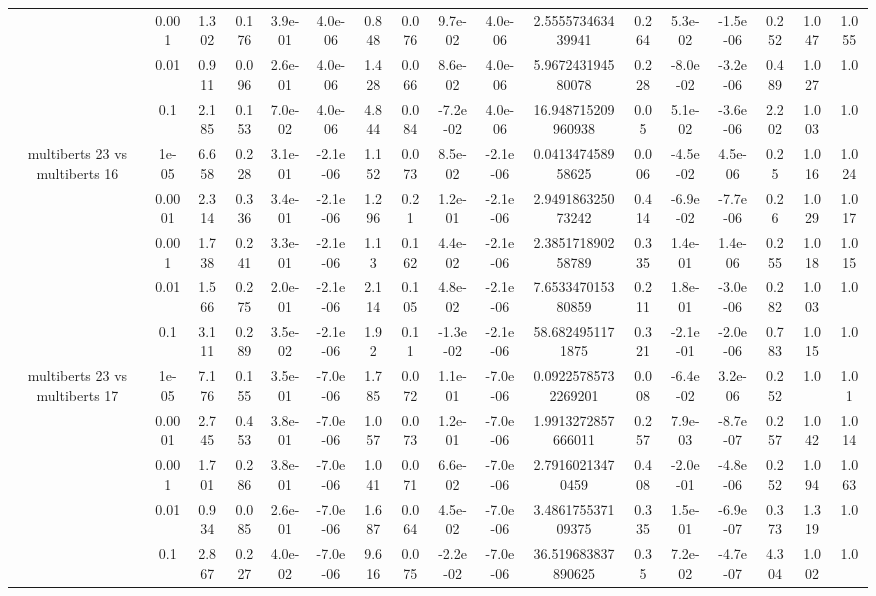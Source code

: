 \begin{tabular}{|c|c|c|c|c|c|c|c|c|c|c|c|c|c|c|c|c|}
 & 0.001 & 1.302 & 0.176 & 3.9e-01 & 4.0e-06 & 0.848 & 0.076 & 9.7e-02 & 4.0e-06 & 2.555573463439941 & 0.264 & 5.3e-02 & -1.5e-06 & 0.252 & 1.047 & 1.055 \\
 & 0.01 & 0.911 & 0.096 & 2.6e-01 & 4.0e-06 & 1.428 & 0.066 & 8.6e-02 & 4.0e-06 & 5.967243194580078 & 0.228 & -8.0e-02 & -3.2e-06 & 0.489 & 1.027 & 1.0 \\
 & 0.1 & 2.185 & 0.153 & 7.0e-02 & 4.0e-06 & 4.844 & 0.084 & -7.2e-02 & 4.0e-06 & 16.948715209960938 & 0.05 & 5.1e-02 & -3.6e-06 & 2.202 & 1.003 & 1.0 \\
\hline
\multirow{5}{*}{multiberts 23 vs multiberts 16} & 1e-05 & 6.658 & 0.228 & 3.1e-01 & -2.1e-06 & 1.152 & 0.073 & 8.5e-02 & -2.1e-06 & 0.041347458958625 & 0.006 & -4.5e-02 & 4.5e-06 & 0.25 & 1.016 & 1.024 \\
 & 0.0001 & 2.314 & 0.336 & 3.4e-01 & -2.1e-06 & 1.296 & 0.21 & 1.2e-01 & -2.1e-06 & 2.949186325073242 & 0.414 & -6.9e-02 & -7.7e-06 & 0.26 & 1.029 & 1.017 \\
 & 0.001 & 1.738 & 0.241 & 3.3e-01 & -2.1e-06 & 1.13 & 0.162 & 4.4e-02 & -2.1e-06 & 2.385171890258789 & 0.335 & 1.4e-01 & 1.4e-06 & 0.255 & 1.018 & 1.015 \\
 & 0.01 & 1.566 & 0.275 & 2.0e-01 & -2.1e-06 & 2.114 & 0.105 & 4.8e-02 & -2.1e-06 & 7.653347015380859 & 0.211 & 1.8e-01 & -3.0e-06 & 0.282 & 1.003 & 1.0 \\
 & 0.1 & 3.111 & 0.289 & 3.5e-02 & -2.1e-06 & 1.92 & 0.11 & -1.3e-02 & -2.1e-06 & 58.6824951171875 & 0.321 & -2.1e-01 & -2.0e-06 & 0.783 & 1.015 & 1.0 \\
\hline
\multirow{5}{*}{multiberts 23 vs multiberts 17} & 1e-05 & 7.176 & 0.155 & 3.5e-01 & -7.0e-06 & 1.785 & 0.072 & 1.1e-01 & -7.0e-06 & 0.09225785732269201 & 0.008 & -6.4e-02 & 3.2e-06 & 0.252 & 1.0 & 1.01 \\
 & 0.0001 & 2.745 & 0.453 & 3.8e-01 & -7.0e-06 & 1.057 & 0.073 & 1.2e-01 & -7.0e-06 & 1.9913272857666011 & 0.257 & 7.9e-03 & -8.7e-07 & 0.257 & 1.042 & 1.014 \\
 & 0.001 & 1.701 & 0.286 & 3.8e-01 & -7.0e-06 & 1.041 & 0.071 & 6.6e-02 & -7.0e-06 & 2.79160213470459 & 0.408 & -2.0e-01 & -4.8e-06 & 0.252 & 1.094 & 1.063 \\
 & 0.01 & 0.934 & 0.085 & 2.6e-01 & -7.0e-06 & 1.687 & 0.064 & 4.5e-02 & -7.0e-06 & 3.486175537109375 & 0.335 & 1.5e-01 & -6.9e-07 & 0.373 & 1.319 & 1.0 \\
 & 0.1 & 2.867 & 0.227 & 4.0e-02 & -7.0e-06 & 9.616 & 0.075 & -2.2e-02 & -7.0e-06 & 36.519683837890625 & 0.35 & 7.2e-02 & -4.7e-07 & 4.304 & 1.002 & 1.0 \\

\end{tabular}
